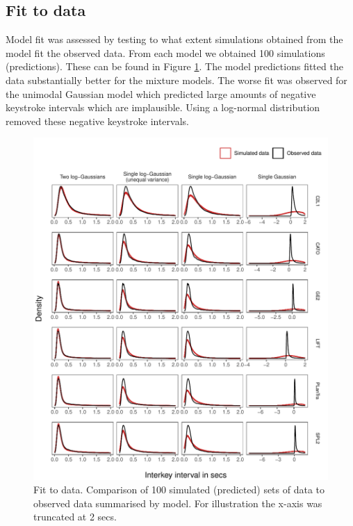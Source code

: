 \documentclass[
  english,
  man,floatsintext]{apa7}
\begin{document}
\clearpage
\makeatletter
\efloat@restorefloats
\makeatother


\begin{appendix}
\section{}
\hypertarget{fit-to-data}{%
\subsection{Fit to data}\label{fit-to-data}}

Model fit was assessed by testing to what extent simulations obtained
from the model fit the observed data. From each model we obtained 100
simulations (predictions). These can be found in Figure
\ref{fig:prediction}. The model predictions fitted the data
substantially better for the mixture models. The worse fit was observed
for the unimodal Gaussian model which predicted large amounts of
negative keystroke intervals which are implausible. Using a log-normal
distribution removed these negative keystroke intervals.

\begin{figure}

{\centering \includegraphics{figures/fitplots} 

}

\caption{Fit to data. Comparison of 100 simulated (predicted) sets of data to observed data summarised by model. For illustration the x-axis was truncated at 2 secs.}\label{fig:prediction}
\end{figure}
\end{appendix}
\end{document}
